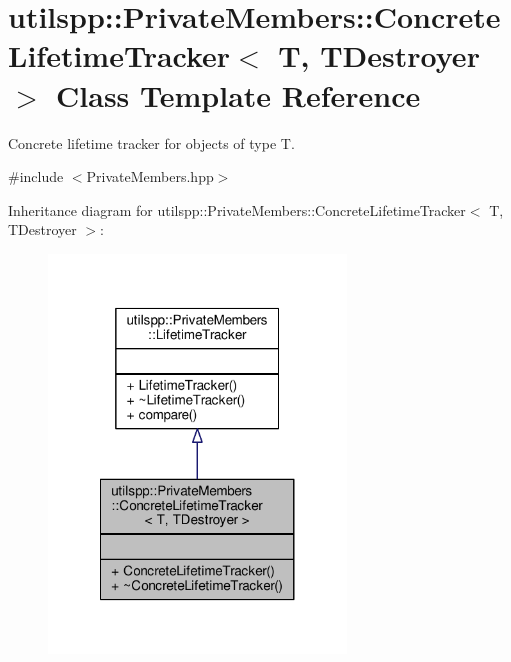 \hypertarget{classutilspp_1_1PrivateMembers_1_1ConcreteLifetimeTracker}{\section{utilspp\-:\-:Private\-Members\-:\-:Concrete\-Lifetime\-Tracker$<$ T, T\-Destroyer $>$ Class Template Reference}
\label{classutilspp_1_1PrivateMembers_1_1ConcreteLifetimeTracker}
}


Concrete lifetime tracker for objects of type T.  




{\ttfamily \#include $<$Private\-Members.\-hpp$>$}



Inheritance diagram for utilspp\-:\-:Private\-Members\-:\-:Concrete\-Lifetime\-Tracker$<$ T, T\-Destroyer $>$\-:\nopagebreak
\begin{figure}[H]
\begin{center}
\leavevmode
\includegraphics[width=224pt]{classutilspp_1_1PrivateMembers_1_1ConcreteLifetimeTracker__inherit__graph}
\end{center}
\end{figure}


